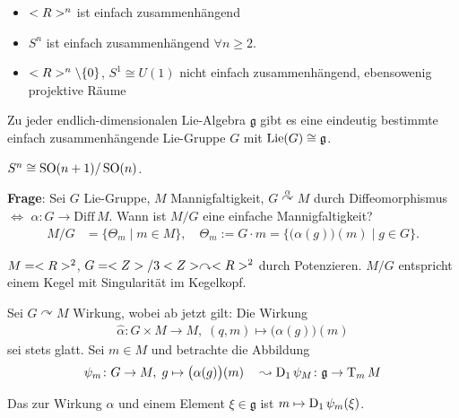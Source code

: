 \begin{example}
	\begin{itemize}
		\item $<R>^n$ ist einfach zusammenhängend
		\item $S^n$ ist einfach zusammenhängend $\forall n\ge 2$.
		\item $<R>^n\setminus\{0\}$, $S^1\cong U(1)$ nicht einfach zusammenhängend, ebensowenig projektive Räume
	\end{itemize}
\end{example}

\begin{proposition}
	Zu jeder endlich-dimensionalen Lie-Algebra $\mathfrak g$ gibt es eine eindeutig bestimmte einfach zusammenhängende Lie-Gruppe $G$ mit $\operatorname{Lie}(G)\cong\mathfrak g$.
\end{proposition}

\begin{example}
	$S^n\cong \operatorname{SO}(n+1)\slash \operatorname{SO}(n)$.
\end{example}

\textbf{Frage}: Sei $G$ Lie-Gruppe, $M$ Mannigfaltigkeit, $G\overset\alpha\curvearrowright M$ durch Diffeomorphismus $\Leftrightarrow$ $\alpha\colon G\to\mathrm{Diff}\,M$. Wann ist $M\slash G$ eine einfache Mannigfaltigkeit?\begin{align*}
	M\slash G &= \{ \Theta_m\mid m\in M \},\quad\Theta_m := G\cdot m = \Big\{ \big(\alpha(g)\big)(m)\;\Big|\;g\in G \}.
\end{align*}

\begin{example}
	$M=<R>^2$, $G=<Z>\slash 3<Z>\curvearrowright <R>^2$ durch Potenzieren. $M\slash G$ entspricht einem Kegel mit Singularität im Kegelkopf.
\end{example}

Sei $G\curvearrowright M$ Wirkung, wobei ab jetzt gilt: Die Wirkung \begin{align*}
	\hat\alpha\colon G\times M\to M,\; (q,m)\mapsto \big(\alpha(g)\big)(m)
\end{align*}
sei stets glatt. Sei $m\in M$ und betrachte die Abbildung \begin{align*}
	\psi_m\colon G\to M,\;g\mapsto \big(\alpha(g)\big)(m)\quad\leadsto \operatorname{D}_1 \psi_M\colon\mathfrak g\to \operatorname{T}_m  M
\end{align*}

\begin{definition}
	Das  zur Wirkung $\alpha$ und einem Element $\xi\in\mathfrak g$ ist $m\mapsto \operatorname{D}_1 \psi_m(\xi)$.
\end{definition}


